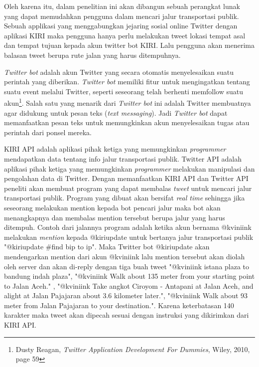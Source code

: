 Oleh karena itu, dalam penelitian ini akan dibangun sebuah perangkat lunak yang dapat memudahkan pengguna dalam mencari jalur transportasi publik. Sebuah applikasi yang menggabungkan jejaring sosial online Twitter dengan aplikasi KIRI maka pengguna hanya perlu melakukan tweet lokasi tempat asal dan tempat tujuan kepada akun twitter bot KIRI. Lalu pengguna akan menerima balasan tweet berupa rute jalan yang harus ditempuhnya.

\textit{Twitter bot} adalah akun Twitter yang secara otomatis menyelesaikan suatu perintah yang diberikan. \textit{Twitter bot} memiliki fitur untuk  mengingatkan tentang suatu event melalui Twitter, seperti seseorang telah berhenti memfollow suatu akun\footnote{Dusty Reagan, \textit{Twitter Application Development For Dummies}, Wiley, 2010, page 59}. Salah satu yang menarik dari \textit{Twitter bot} ini adalah Twitter membuatnya agar didukung untuk pesan teks (\textit{text messaging}). Jadi \textit{Twitter bot} dapat memanfaatkan pesan teks untuk memungkinkan akun menyelesaikan tugas atau perintah dari ponsel mereka.

KIRI API adalah aplikasi pihak ketiga yang memungkinkan \textit{programmer} mendapatkan data tentang info jalur transportasi publik. Twitter API adalah aplikasi pihak ketiga yang memungkinkan \textit{programmer} melakukan manipulasi dan pengolahan data di Twitter. Dengan memanfaatkan KIRI API dan Twitter API peneliti akan membuat program yang dapat membalas \textit{tweet} untuk mencari jalur transportasi publik. Program yang dibuat akan bersifat \textit{real time} sehingga jika seseorang melakukan mention kepada bot pencari jalur maka bot akan menangkapnya dan membalas mention tersebut berupa jalur yang harus ditempuh. Contoh dari jalannya program adalah ketika akun bernama @kviniink melakukan \textit{mention} kepada @kiriupdate untuk bertanya jalur transportasi publik "@kiriupdate \#find bip to ip". Maka Twitter bot @kiriupdate akan mendengarkan mention dari akun @kviniink lalu mention tersebut akan diolah oleh server dan akan di-reply dengan tiga buah tweet "@kviniink istana plaza to bandung indah plaza", "@kviniink Walk about 135 meter from your starting point to Jalan Aceh." , "@kviniink Take angkot Ciroyom - Antapani at Jalan Aceh, and alight at Jalan Pajajaran about 3.6 kilometer later.", "@kviniink Walk about 93 meter from Jalan Pajajaran to your destination.". Karena keterbatasan 140 karakter maka tweet akan dipecah sesuai dengan instruksi yang dikirimkan dari KIRI API.

